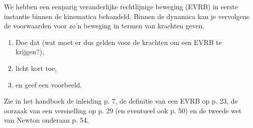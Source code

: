 
\begin{exercise}



We hebben een eenparig veranderlijke rechtlijnige beweging (EVRB) in eerste instantie binnen de kinematica behandeld. Binnen de dynamica kan je vervolgens de voorwaarden voor zo'n beweging in termen van krachten geven. 

\begin{enumerate}
\item Doe dat (wat moet er dus gelden voor de krachten om een EVRB te krijgen?), 
\item licht kort toe,
\item en geef een voorbeeld.
\end{enumerate}

\begin{oplossing}
Zie in het handboek de inleiding p. 7, de definitie van een EVRB op p. 23, de oorzaak van een versnelling op p. 29 (en eventueel ook p. 50) en de tweede wet van Newton onderaan p. 54.
\end{oplossing}

\end{exercise}
